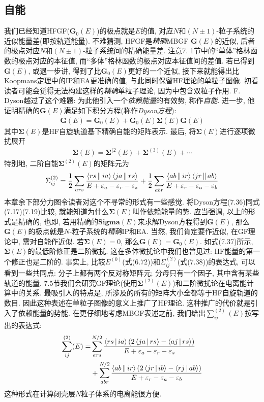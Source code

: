 \subsection{自能}
我们已经知道HFGF($\mathbf{G}_0(E)$)的极点就是$E$的值, 
对应$N$和$(N\pm1)$-粒子系统的近似能量差(即按轨道能量). 
不难猜测, 
HFGF是\emph{精确}MBGF $\mathbf{G}(E)$的近似, 
后者的极点对应$N$和$(N\pm1)$-粒子系统间的精确能量差. 
注意7.
1节中的“单体”格林函数的极点对应\ha 的本征值, 
而“多体”格林函数的极点对应本征值间的差值. 
若已得到$\mathbf{G}(E)$, 
或退一步讲, 
得到了比$\mathbf{G}_0(E)$更好的一个近似, 
接下来就能得出比Koopmans定理中的IP和EA更准确的值, 
与此同时保留HF理论的单粒子图像. 
初看读者可能会觉得无法构建这样的\emph{精确}单粒子理论, 
因为\ha 中包含双粒子作用. 
F. Dyson越过了这个难题: 为此他引入一个\emph{依赖能量}的有效势, 
称作\emph{自能}. 
进一步, 
他证明精确的$\mathbf{G}(E)$满足如下积分方程(称作\emph{Dyson方程}):
\begin{align}\label{7.36}
\mathbf{G}(E) = \mathbf{G}_0(E) + \mathbf{G}_0(E)\mathbf{\Sigma}(E)\mathbf{G}(E) 
\end{align}
其中$\mathbf{\Sigma}(E)$是HF自旋轨道基下精确自能的矩阵表示. 
最后, 
将$\mathbf{\Sigma}(E)$进行逐项微扰展开
\begin{align}
\mathbf{\Sigma}(E) = \mathbf{\Sigma}^{(2}(E) + \mathbf{\Sigma}^{(3)}(E) + \cdots
\end{align}
特别地, 
二阶自能$\mathbf{\Sigma}^{(2)}(E)$的矩阵元为
\begin{align}\label{7.38}
\Sigma_{ij}^{(2)} = \frac{1}{2}\sum_{ars}\frac{\Braket{rs||ia}\Braket{ja||rs}}{E+\varepsilon_a-\varepsilon_r-\varepsilon_s} + 
\frac{1}{2}\sum_{abr}\frac{\Braket{ab||ir}\Braket{jr||ab}}{E+\varepsilon_r-\varepsilon_a-\varepsilon_b}
\end{align}
本章余下部分力图令读者对这个不寻常的形式有一些感觉. 
将Dyson方程(7.36)同式(7.17)(7.19)比较, 
就能知道为什么$\mathbf{\Sigma}(E)$叫作依赖能量的势. 
应当强调, 
以上的形式是精确的, 
也即, 
若用精确的$\mathbf{Sigma}(E)$来求解Dyson方程得到$\mathbf{G}(E)$, 
那么$\mathbf{G}(E)$的极点就是$N$-粒子系统的\emph{精确}IP和EA. 
当然, 
我们肯定要作近似, 
在GF理论中, 
需对自能作近似. 
若$\mathbf{\Sigma}(E)=0$, 
那么$\mathbf{G}(E)=\mathbf{G}_0(E)$. 
如式(7.37)所示, 
$\mathbf{\Sigma}(E)$的最低阶修正是二阶微扰. 
这在多体微扰论中我们也曾见过: HF能量的第一个修正也是二阶的. 
事实上, 
比较$E^{(0)}$(式(6.72))和$\Sigma_{ij}^{(2)}$(式(7.38))的表达式, 
可以看到一些共同点: 分子上都有两个反对称矩阵元; 
分母只有一个因子, 
其中含有某些轨道的能量. 
7.5节我们会研究GF理论(使用$\mathbf{\Sigma}^{(2)}(E)$)和二阶微扰论在电离能计算中的关系. 
最吸引人的特点是, 
所涉及的所有的矩阵大小全都等于HF自旋轨道的数目. 
因此这种表述在单粒子图像的意义上推广了HF理论. 
这种推广的代价就是引入了依赖能量的势能. 
在更仔细地考虑MBGF表述之前, 
我们给出$\sum_{ij}^{(2)}(E)$按写出的表达式:
\begin{align}
\sum_{ij}^{(2)}(E) = & \sum_{ars}^{N/2} \frac{\Braket{rs|ia}(2\Braket{ja|rs}-\Braket{aj|rs})}{E+\varepsilon_a-\varepsilon_r-\varepsilon_s}\notag\\
                     & + \sum_{abr}^{N/2}\frac{\Braket{ab||ir}(2\Braket{jr|ib}-\Braket{rj|ab})}{E+\varepsilon_r-\varepsilon_a-\varepsilon_b}
		     \label{7.39}
\end{align}
这种形式在计算闭壳层$N$粒子体系的电离能很方便.

